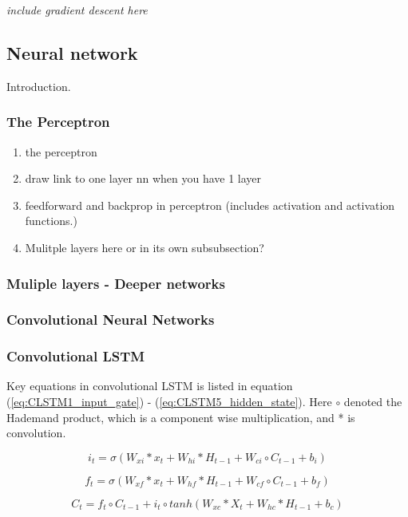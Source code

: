 \textit{include gradient descent here}

\subsection{Neural network}
Introduction. 
\subsubsection{The Perceptron}
\begin{enumerate}
    \item the perceptron 
    \item draw link to one layer nn when you have 1 layer 
    \item feedforward and backprop in perceptron (includes activation and activation functions.)
    \item Mulitple layers here or in its own subsubsection?
\end{enumerate}

\subsubsection{Muliple layers - Deeper networks}

\subsubsection{Convolutional Neural Networks}

\subsubsection{Convolutional LSTM}
\label{sec:conv_lstm}
Key equations in convolutional LSTM is listed in equation (\ref{eq:CLSTM1_input_gate}) - (\ref{eq:CLSTM5_hidden_state}). Here $\circ$ denoted the Hademand product, which is a component wise multiplication, and * is convolution. 

\begin{equation} \label{eq:CLSTM1_input_gate}
    i_t = \sigma \left( W_{xi}*x_t + W_{hi}*H_{t-1} + W_{ci}\circ C_{t-1}+b_i \right) 
\end{equation}

\begin{equation} \label{eq:CLSTM2_forget_gate}
        f_t = \sigma \left( W_{xf}*x_t + W_{hf}*H_{t-1} + W_{cf}\circ C_{t-1}+b_f \right) 
\end{equation}

\begin{equation} \label{eq:CLSTM3_cellstate}
        C_t = f_t \circ C_{t-1} +i_t\circ tanh\left( W_{xc}*X_t + W_{hc}*H_{t-1} + b_c \right)
\end{equation}

